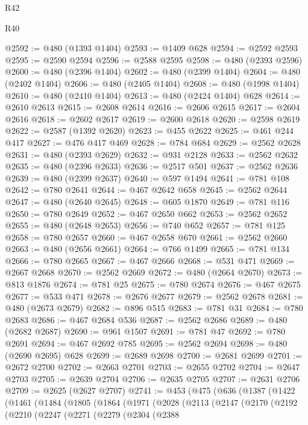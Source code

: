 \begin{lexlean}{R42}
\begin{lexlean}{R40}
\begin{coremodule}
{{{{{{{{{{{{{{{{{{{{{{{{{{{{{{{{{{{{{{{{{{{{{{{{{{{{{{{{{{{{{{{{{{{{{{{{{{{{{{{{{{{{{{{{{{{{{{{{{{{{{{{{{{{{{@2592 := @480 (@1393 @1404)
@2593 := @1409 @628
@2594 := @2592 @2593
@2595 := @2590 @2594
@2596 := @2588 @2595
@2598 := @480 (@2393 @2596)
@2600 := @480 (@2396 @1404)
@2602 := @480 (@2399 @1404)
@2604 := @480 (@2402 @1404)
@2606 := @480 (@2405 @1404)
@2608 := @480 (@1998 @1404)
@2610 := @480 (@2410 @1404)
@2613 := @480 (@2424 @1404) @628
@2614 := @2610 @2613
@2615 := @2608 @2614
@2616 := @2606 @2615
@2617 := @2604 @2616
@2618 := @2602 @2617
@2619 := @2600 @2618
@2620 := @2598 @2619
@2622 := @2587 (@1392 @2620)
@2623 := @455 @2622
@2625 := @461 @244 @417
@2627 := @476 @417 @469
@2628 := @784 @684
@2629 := @2562 @2628
@2631 := @480 (@2393 @2629)
@2632 := @931 @2128
@2633 := @2562 @2632
@2635 := @480 (@2396 @2633)
@2636 := @2517 @501
@2637 := @2562 @2636
@2639 := @480 (@2399 @2637)
@2640 := @597 @1494
@2641 := @781 @108
@2642 := @780 @2641
@2644 := @467 @2642 @658
@2645 := @2562 @2644
@2647 := @480 (@2640 @2645)
@2648 := @605 @1870
@2649 := @781 @116
@2650 := @780 @2649
@2652 := @467 @2650 @662
@2653 := @2562 @2652
@2655 := @480 (@2648 @2653)
@2656 := @740 @652
@2657 := @781 @125
@2658 := @780 @2657
@2660 := @467 @2658 @670
@2661 := @2562 @2660
@2663 := @480 (@2656 @2661)
@2664 := @766 @1499
@2665 := @781 @134
@2666 := @780 @2665
@2667 := @467 @2666
@2668 := @531 @471
@2669 := @2667 @2668
@2670 := @2562 @2669
@2672 := @480 (@2664 @2670)
@2673 := @813 @1876
@2674 := @781 @25
@2675 := @780 @2674
@2676 := @467 @2675
@2677 := @533 @471
@2678 := @2676 @2677
@2679 := @2562 @2678
@2681 := @480 (@2673 @2679)
@2682 := @896 @515
@2683 := @781 @31
@2684 := @780 @2683
@2686 := @467 @2684 @536
@2687 := @2562 @2686
@2689 := @480 (@2682 @2687)
@2690 := @961 @1507
@2691 := @781 @47
@2692 := @780 @2691
@2694 := @467 @2692 @785
@2695 := @2562 @2694
@2698 := @480 (@2690 @2695) @628
@2699 := @2689 @2698
@2700 := @2681 @2699
@2701 := @2672 @2700
@2702 := @2663 @2701
@2703 := @2655 @2702
@2704 := @2647 @2703
@2705 := @2639 @2704
@2706 := @2635 @2705
@2707 := @2631 @2706
@2709 := @2625 (@2627 @2707)
@2741 := @453
    (@475
      (@636
        (@1387
          (@1422
            (@1461
              (@1484
                (@1805
                  (@1864
                    (@1971
                      (@2028
                        (@2113
                          (@2147
                            (@2170
                              (@2192
                                (@2210
                                  (@2247
                                    (@2271
                                      (@2279
                                        (@2304
                                          (@2388
}}}}}}}}}}}}}}}}}}}}}}}}}}}}}}}}}}}}}}}}}}}}}}}}}}}}}}}}}}}}}}}}}}}}}}}}}}}}}}}}}}}}}}}}}}}}}}}}}}}}}}}}}}}}}
\end{coremodule}
\end{lexlean}
\end{lexlean}
